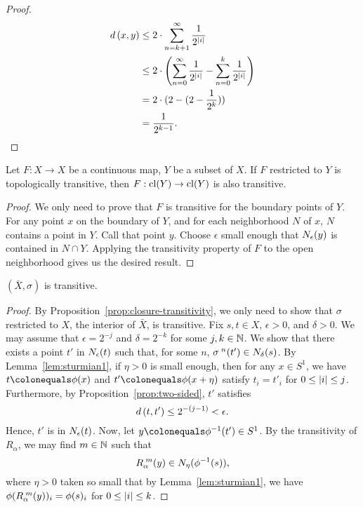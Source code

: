 \documentclass[10pt,twoside,draft]{book}
\begin{document}
\begin{example}
\begin{proposition}
\begin{proof}
      \begin{align*}
        d\left( x,y \right)
        &\leq 2 \cdot \sum\limits_{n = k+1}^{\infty} \frac{1}{2^{\left | i \right |}} \\
        &\leq 2 \cdot \left (  \sum\limits_{n = 0}^{\infty} \frac{1}{2^{\left | i \right |}} - \sum\limits_{n = 0}^{k} \frac{1}{2^{\left | i \right |}} \right ) \\
        &= 2 \cdot (2 - (2 - \frac{1}{2^k})) \\
        &= \frac{1}{2^{k-1}}.
      \end{align*}
    \end{proof}
  \end{proposition}
  \begin{proposition}
    Let $F: X \to X$ be a continuous map, $Y$ be a subset of $X$.
    If $F$ restricted to $Y$ is topologically transitive, then $F: \mathrm{cl}(Y) \to \mathrm{cl}(Y)$ is also transitive.
    \label{prop:closure-transitivity}
    \begin{proof}
      We only need to prove that $F$ is transitive for the boundary points of $Y$.
      For any point $x$ on the boundary of $Y$, and for each neighborhood $N$ of $x$, $N$ contains a point in $Y$.
      Call that point $y$.
      Choose $\epsilon$ small enough that $N_{\epsilon}(y)$ is contained in $N \cap Y$.
      Applying the transitivity property of $F$ to the open neighborhood gives us the desired result.
    \end{proof}
  \end{proposition}
  \begin{proposition}
    $(\bar{X}, \sigma)$ is transitive.
    \begin{proof}
      By Proposition~\ref{prop:closure-transitivity}, we only need to show that $\sigma$ restricted to $X$, the interior of $\bar{X}$, is transitive.
      Fix $s, t \in X$, $\epsilon > 0$, and $\delta > 0$.
      We may assume that $\epsilon = 2^{-j}$ and $\delta = 2^{-k}$ for some $j,k \in \mathbb{N}$.
      We show that there exists a point $t'$ in $N_{\epsilon}(t)$ such that, for some $n$, $\sigma^{\;n}(t') \in N_{\delta}(s)$.
      By Lemma~\ref{lem:sturmian1}, if $\eta > 0$ is small enough, then for any $x \in S^1$, we have $t \ceq \phi(x)$ and $t' \ceq \phi(x + \eta)$ satisfy $t_i = t'_i$ for $0 \leq \left | i \right | \leq j$.
      Furthermore, by Proposition~\ref{prop:two-sided}, $t'$ satisfies
      \begin{equation*}
        d\left( t, t' \right) \leq 2^{-(j-1)} < \epsilon.
      \end{equation*}
      Hence, $t'$ is in $N_{\epsilon}(t)$.
      Now, let $y \ceq \phi^{-1}(t') \in S^1$.
      By the transitivity of $R_\alpha$, we may find $m \in \mathbb{N}$ such that
      \begin{equation*}
        R_\alpha^{\;m}(y) \in N_{\eta}(\phi^{-1}(s)),
      \end{equation*}
      where $\eta > 0$ taken so small that by Lemma~\ref{lem:sturmian1}, we have 
      $\phi(R_\alpha^{\;m}(y))_i = \phi(s)_i$ for $0 \leq \left | i \right | \leq k$.


\end{proof}
\end{proposition}
\end{example}
\end{document}
